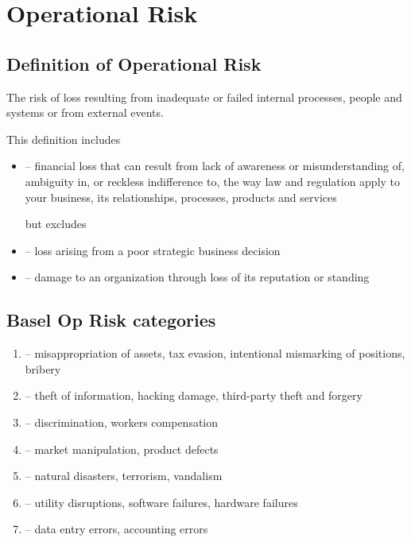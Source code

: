 \section{Operational Risk}
\subsection*{Definition of Operational Risk}
The risk of loss resulting from inadequate or failed
internal processes, people and systems or from external
events.

This definition includes
\begin{itemize}[leftmargin=*]
    \item {} – financial loss that can result from lack
of awareness or misunderstanding of, ambiguity
in, or reckless indifference to, the way law and
regulation apply to your business, its relationships,
processes, products and services

but excludes
    \item {} – loss arising from a poor strategic
business decision
    \item {} – damage to an organization
through loss of its reputation or standing
\end{itemize}





\subsection*{Basel Op Risk categories}
\begin{enumerate}[label = (\arabic*), leftmargin=*]
    \item {} – misappropriation of assets, tax
evasion, intentional mismarking of positions, bribery
    \item {} – theft of information, hacking
damage, third-party theft and forgery
    \item {} –
discrimination, workers compensation
    \item {} – market
manipulation, product defects
    \item {} – natural disasters,
terrorism, vandalism
    \item {} – utility
disruptions, software failures, hardware failures
    \item {} –
data entry errors, accounting errors
\end{enumerate}






